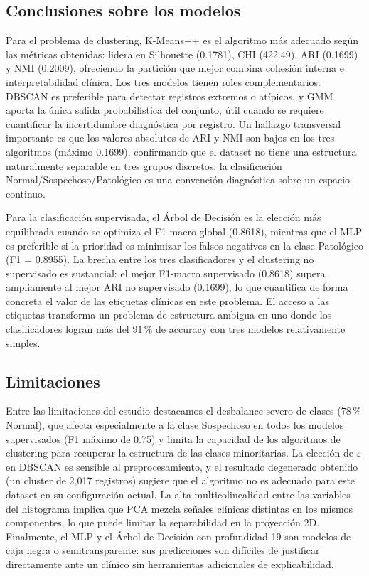\documentclass[12pt,letterpaper]{article}
\begin{document}
\subsection{Conclusiones sobre los modelos}
 
Para el problema de clustering, K-Means++ es el algoritmo más adecuado según las
métricas obtenidas: lidera en Silhouette (0.1781), CHI (422.49), ARI (0.1699) y NMI
(0.2009), ofreciendo la partición que mejor combina cohesión interna e interpretabilidad
clínica. Los tres modelos tienen roles complementarios: DBSCAN es preferible para
detectar registros extremos o atípicos, y GMM aporta la única salida probabilística del
conjunto, útil cuando se requiere cuantificar la incertidumbre diagnóstica por registro.
Un hallazgo transversal importante es que los valores absolutos de ARI y NMI son bajos
en los tres algoritmos (máximo 0.1699), confirmando que el dataset no tiene una
estructura naturalmente separable en tres grupos discretos: la clasificación
Normal/Sospechoso/Patológico es una convención diagnóstica sobre un espacio continuo.
 
Para la clasificación supervisada, el Árbol de Decisión es la elección más equilibrada
cuando se optimiza el F1-macro global (0.8618), mientras que el MLP es preferible si la
prioridad es minimizar los falsos negativos en la clase Patológico (F1 = 0.8955). La
brecha entre los tres clasificadores y el clustering no supervisado es sustancial: el
mejor F1-macro supervisado (0.8618) supera ampliamente al mejor ARI no supervisado
(0.1699), lo que cuantifica de forma concreta el valor de las etiquetas clínicas en
este problema. El acceso a las etiquetas transforma un problema de estructura ambigua
en uno donde los clasificadores logran más del 91\,\% de accuracy con tres modelos
relativamente simples.
 
\subsection{Limitaciones}
 
Entre las limitaciones del estudio destacamos el desbalance severo de clases (78\,\%
Normal), que afecta especialmente a la clase Sospechoso en todos los modelos supervisados
(F1 máximo de 0.75) y limita la capacidad de los algoritmos de clustering para recuperar
la estructura de las clases minoritarias. La elección de $\varepsilon$ en DBSCAN es
sensible al preprocesamiento, y el resultado degenerado obtenido (un cluster de 2{,}017
registros) sugiere que el algoritmo no es adecuado para este dataset en su configuración
actual. La alta multicolinealidad entre las variables del histograma implica que PCA mezcla
señales clínicas distintas en los mismos componentes, lo que puede limitar la separabilidad
en la proyección 2D. Finalmente, el MLP y el Árbol de Decisión con profundidad 19 son
modelos de caja negra o semitransparente: sus predicciones son difíciles de justificar
directamente ante un clínico sin herramientas adicionales de explicabilidad.
 
\end{document}
